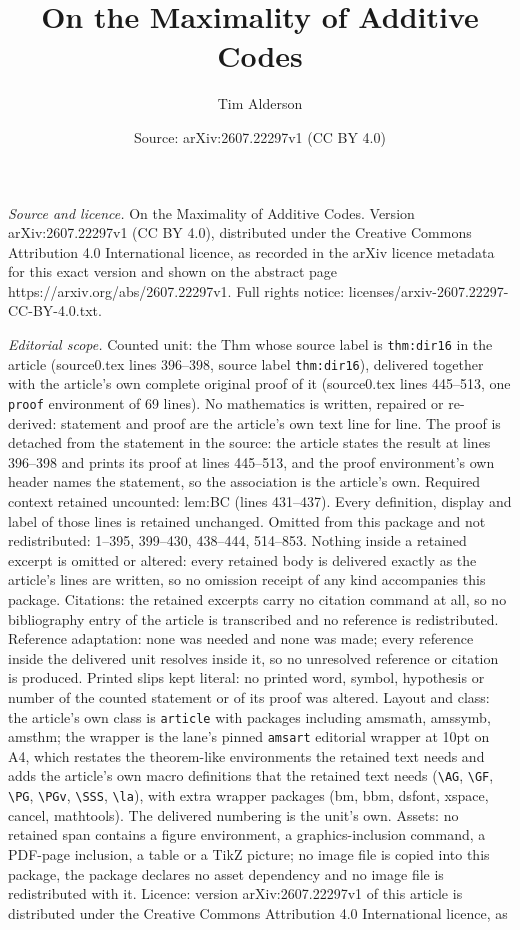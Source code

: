 \documentclass[10pt,a4paper]{amsart}
\title[On the Maximality of Additive Codes]{On the Maximality of Additive Codes}
\author{Tim Alderson}
\date{Source: arXiv:2607.22297v1 (CC BY 4.0)}
\begin{document}
\maketitle

\noindent\emph{Source and licence.} On the Maximality of Additive Codes. Version arXiv:2607.22297v1 (CC BY 4.0), distributed under the Creative Commons Attribution 4.0 International licence, as recorded in the arXiv licence metadata for this exact version and shown on the abstract page https://arxiv.org/abs/2607.22297v1. Full rights notice: licenses/arxiv-2607.22297-CC-BY-4.0.txt.\par\smallskip

\noindent\textit{Editorial scope.} Counted unit: the Thm whose source label is \texttt{thm:dir16} in the article (source0.tex lines 396--398, source label \texttt{thm:dir16}), delivered together with the article's own complete original proof of it (source0.tex lines 445--513, one \texttt{proof} environment of 69 lines). No mathematics is written, repaired or re-derived: statement and proof are the article's own text line for line. The proof is detached from the statement in the source: the article states the result at lines 396--398 and prints its proof at lines 445--513, and the proof environment's own header names the statement, so the association is the article's own. Required context retained uncounted: lem:BC (lines 431--437). Every definition, display and label of those lines is retained unchanged. Omitted from this package and not redistributed: 1--395, 399--430, 438--444, 514--853. Nothing inside a retained excerpt is omitted or altered: every retained body is delivered exactly as the article's lines are written, so no omission receipt of any kind accompanies this package. Citations: the retained excerpts carry no citation command at all, so no bibliography entry of the article is transcribed and no reference is redistributed. Reference adaptation: none was needed and none was made; every reference inside the delivered unit resolves inside it, so no unresolved reference or citation is produced. Printed slips kept literal: no printed word, symbol, hypothesis or number of the counted statement or of its proof was altered. Layout and class: the article's own class is \texttt{article} with packages including amsmath, amssymb, amsthm; the wrapper is the lane's pinned \texttt{amsart} editorial wrapper at 10pt on A4, which restates the theorem-like environments the retained text needs and adds the article's own macro definitions that the retained text needs (\texttt{\textbackslash AG}, \texttt{\textbackslash GF}, \texttt{\textbackslash PG}, \texttt{\textbackslash PGv}, \texttt{\textbackslash SSS}, \texttt{\textbackslash la}), with extra wrapper packages (bm, bbm, dsfont, xspace, cancel, mathtools). The delivered numbering is the unit's own. Assets: no retained span contains a figure environment, a graphics-inclusion command, a PDF-page inclusion, a table or a TikZ picture; no image file is copied into this package, the package declares no asset dependency and no image file is redistributed with it. Licence: version arXiv:2607.22297v1 of this article is distributed under the Creative Commons Attribution 4.0 International licence, as 
\end{document}
